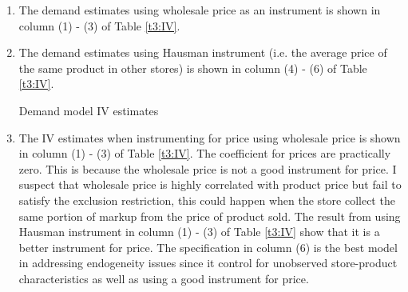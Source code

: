 \documentclass{article}
\begin{document}
\begin{enumerate}
\begin{table}[H]
\centering
\begin{threeparttable}
\caption{Demand model OLS estimates}\label{t2:OLS}

\end{threeparttable}
\end{table}

\item The demand estimates using wholesale price as an instrument is shown in column (1) - (3) of Table \ref{t3:IV}.
\item The demand estimates using Hausman instrument (i.e. the average price of the same product in other
stores) is shown in column (4) - (6) of Table \ref{t3:IV}.

\begin{table}[H]
\centering
\begin{threeparttable}
\caption{Demand model IV estimates}\label{t3:IV}

\end{threeparttable}
\end{table}

\item The IV estimates when instrumenting for price using wholesale price is shown in column (1) - (3) of Table \ref{t3:IV}. The coefficient for prices are practically zero. This is because the wholesale price is not a good instrument for price. I suspect that wholesale price is highly correlated with product price but fail to satisfy the exclusion restriction, this could happen when the store collect the same portion of markup from the price of product sold. The result from using Hausman instrument in column (1) - (3) of Table \ref{t3:IV} show that it is a better instrument for price. The specification in column (6) is the best model in addressing endogeneity issues since it control for unobserved store-product characteristics as well as using a good instrument for price.


\end{enumerate}
\end{document}
